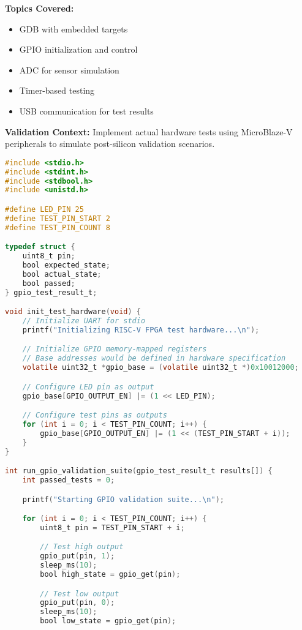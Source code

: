 \documentclass[11pt,a4paper]{article}
\begin{document}
\textbf{Topics Covered:}
\begin{itemize}
    \item GDB with embedded targets
    \item GPIO initialization and control
    \item ADC for sensor simulation
    \item Timer-based testing
    \item USB communication for test results
\end{itemize}

\textbf{Validation Context:}
Implement actual hardware tests using MicroBlaze-V peripherals to simulate post-silicon validation scenarios.

\begin{lstlisting}[language=C, caption=Day 5 Example: GPIO Validation Test]
#include <stdio.h>
#include <stdint.h>
#include <stdbool.h>
#include <unistd.h>

#define LED_PIN 25
#define TEST_PIN_START 2
#define TEST_PIN_COUNT 8

typedef struct {
    uint8_t pin;
    bool expected_state;
    bool actual_state;
    bool passed;
} gpio_test_result_t;

void init_test_hardware(void) {
    // Initialize UART for stdio
    printf("Initializing RISC-V FPGA test hardware...\n");

    // Initialize GPIO memory-mapped registers
    // Base addresses would be defined in hardware specification
    volatile uint32_t *gpio_base = (volatile uint32_t *)0x10012000;

    // Configure LED pin as output
    gpio_base[GPIO_OUTPUT_EN] |= (1 << LED_PIN);

    // Configure test pins as outputs
    for (int i = 0; i < TEST_PIN_COUNT; i++) {
        gpio_base[GPIO_OUTPUT_EN] |= (1 << (TEST_PIN_START + i));
    }
}

int run_gpio_validation_suite(gpio_test_result_t results[]) {
    int passed_tests = 0;

    printf("Starting GPIO validation suite...\n");

    for (int i = 0; i < TEST_PIN_COUNT; i++) {
        uint8_t pin = TEST_PIN_START + i;

        // Test high output
        gpio_put(pin, 1);
        sleep_ms(10);
        bool high_state = gpio_get(pin);

        // Test low output
        gpio_put(pin, 0);
        sleep_ms(10);
        bool low_state = gpio_get(pin);


\end{lstlisting}
\end{document}
